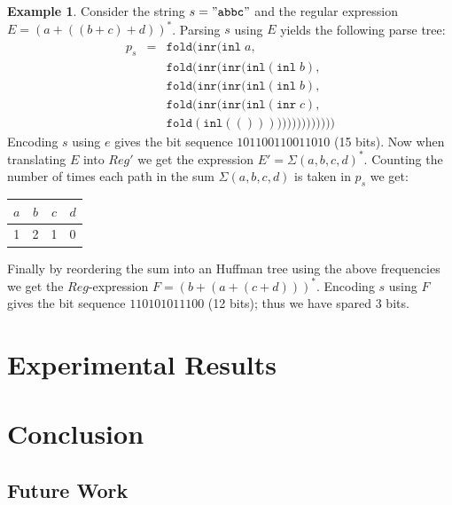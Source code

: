 \documentclass[a4paper, oneside]{memoir}
\theoremstyle{definition}
\newtheorem{example}{Example}
\begin{document}
\begin{example}
Consider the string $s = \mathtt{"abbc"}$ and the regular expression $E = (a + ((b + c) + d))^{*}$. Parsing $s$ using $E$ yields the following parse tree:
\[
\begin{array}{rcl}
p_s & = & \mathtt{fold}(\mathtt{inr}(\mathtt{inl} \; a, \\
    &   & \mathtt{fold}(\mathtt{inr}(\mathtt{inr}(\mathtt{inl}(\mathtt{inl} \; b), \\
    &   & \mathtt{fold}(\mathtt{inr}(\mathtt{inr}(\mathtt{inl}(\mathtt{inl} \; b), \\
    &   & \mathtt{fold}(\mathtt{inr}(\mathtt{inr}(\mathtt{inl}(\mathtt{inr} \; c), \\
    &   & \mathtt{fold}(\mathtt{inl}(()))))))))))))))
\end{array}
\]
\noindent Encoding $s$ using $e$ gives the bit sequence $101100110011010$ (15 bits). Now when translating $E$ into $Reg'$ we get the expression $E' = \Sigma{(a, b, c, d)}^{*}$. Counting the number of times each path in the sum $\Sigma{(a, b, c, d)}$ is taken in $p_s$ we get:

\begin{center}
\begin{tabular}{c|c|c|c}
$a$ & $b$ & $c$ & $d$ \\
\hline
1   & 2   & 1   & 0
\end{tabular}
\end{center}

\noindent Finally by reordering the sum into an Huffman tree using the above frequencies we get the $Reg$-expression $F = (b + (a + (c + d)))^{*}$. Encoding $s$ using $F$ gives the bit sequence $110101011100$ (12 bits); thus we have spared 3 bits.

\end{example}

\section{Experimental Results}

\section{Conclusion}

\subsection{Future Work}



\end{document}
